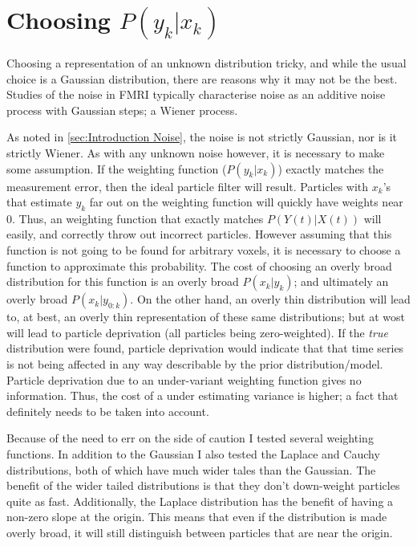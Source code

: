 \section{Choosing $P(y_k | x_k)$}
\label{sec:Methods Weighting Function}
Choosing a representation of an unknown distribution tricky, and while
the usual choice is a Gaussian distribution, there are reasons why it
may not be the best.  Studies of the noise in FMRI typically characterise
noise as an additive noise process with Gaussian steps; a Wiener process. 

As noted in \autoref{sec:Introduction Noise}, the noise is not strictly Gaussian,
nor is it strictly Wiener. As with any unknown noise however, it is necessary 
to make some assumption. If the weighting function ($P(y_k | x_k)$) exactly
matches the measurement error, then the ideal particle filter will result.
Particles with $x_k$'s that estimate $y_k$ far out on the weighting
function will quickly have weights near 0. Thus, an weighting function that
exactly matches $P(Y(t) | X(t))$ will easily, and correctly throw out incorrect
particles. However assuming that this function is not going to be found 
for arbitrary voxels, it is necessary to choose a function to approximate this 
probability. The cost of choosing an overly broad distribution for this
function is an overly broad $P(x_k | y_k)$; and ultimately an overly
broad $P(x_k | y_{0:k})$. On the other hand, an overly thin distribution
will lead to, at best, an overly thin representation of these same 
distributions; but at wost will lead to particle deprivation (all particles
being zero-weighted). If the \emph{true} distribution were found, particle
deprivation would indicate that that time series is not being affected
in any way describable by the prior distribution/model. Particle deprivation
due to an under-variant weighting function gives no information. Thus,
the cost of a under estimating variance is higher; a fact that definitely needs
to be taken into account. 

Because of the need to err on the side of caution I tested several weighting
functions. In addition to the Gaussian I also tested the Laplace and Cauchy
distributions, both of which have much wider tales than the Gaussian. The
benefit of the wider tailed distributions is that they don't down-weight
particles quite as fast. Additionally, the Laplace distribution has the
benefit of having a non-zero slope at the origin. This means that even
if the distribution is made overly broad, it will still distinguish between
particles that are near the origin.


